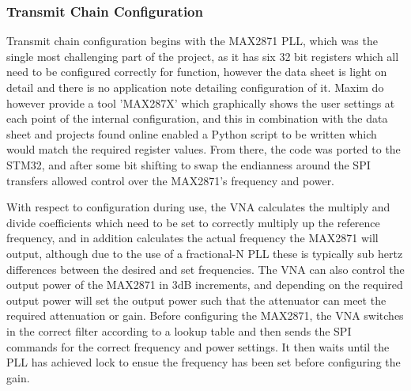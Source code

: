\newpage
\subsubsection{Transmit Chain Configuration}
Transmit chain configuration begins with the MAX2871 PLL, which was the single most challenging part of the project, as it has six 32 bit registers which all need to be configured correctly for function, however the data sheet is light on detail and there is no application note detailing configuration of it. Maxim do however provide a tool 'MAX287X' which graphically shows the user settings at each point of the internal configuration, and this in combination with the data sheet and projects found online \cite{max2871_trans} \cite{max2871_synth} enabled a Python script to be written which would match the required register values. From there, the code was ported to the STM32, and after some bit shifting to swap the endianness around the SPI transfers allowed control over the MAX2871's frequency and power. 

With respect to configuration during use, the VNA calculates the multiply and divide coefficients which need to be set to correctly multiply up the reference frequency, and in addition calculates the actual frequency the MAX2871 will output, although due to the use of a fractional-N PLL these is typically sub hertz differences between the desired and set frequencies. The VNA can also control the output power of the MAX2871 in 3dB increments, and depending on the required output power will set the output power such that the attenuator can meet the required attenuation or gain. Before configuring the MAX2871, the VNA switches in the correct filter according to a lookup table and then sends the SPI commands for the correct frequency and power settings. It then waits until the PLL has achieved lock to ensue the frequency has been set before configuring the gain. 

